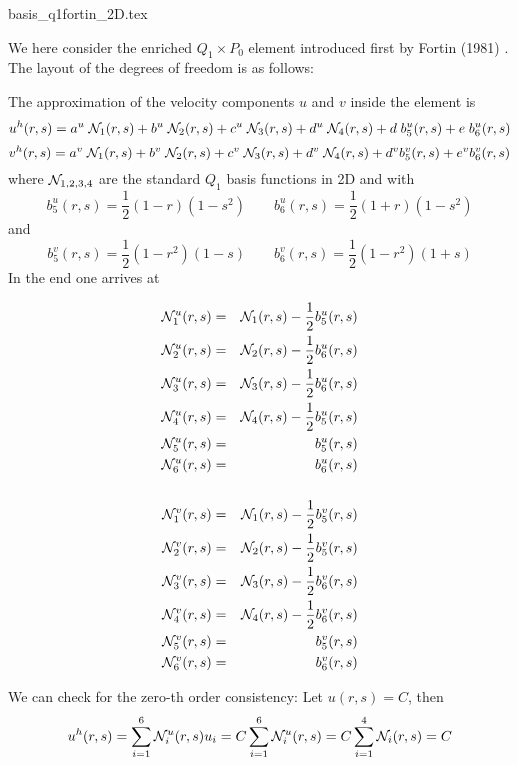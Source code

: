 \begin{flushright} {\tiny {\color{gray} basis\_q1fortin\_2D.tex}} \end{flushright}

We here consider the enriched $Q_1\times P_0$ element introduced first by 
Fortin (1981) \cite{fort81}.
The layout of the degrees of freedom is as follows:



\noindent The approximation of the velocity components $u$ and $v$ inside the element is
\[
u^h(r,s) = a^u \; {\mathcal{N}}_1(r,s) + b^u \;  {\mathcal{N}}_2(r,s) + c^u \; {\mathcal{N}}_3(r,s) +d^u \; {\mathcal{N}}_4(r,s) 
+ d\; b_5^u(r,s) + e\; b_{6}^u(r,s)
\]
\[
v^h(r,s) = a^v \; {\mathcal{N}}_1(r,s) + b^v \;  {\mathcal{N}}_2(r,s) + c^v \; {\mathcal{N}}_3(r,s) +d^v \; {\mathcal{N}}_4(r,s) 
+ d^v b_5^v(r,s) + e^v b_{6}^v(r,s)
\]
where ${\mathcal{N}}_{1,2,3,4}$ are the standard $Q_1$ basis functions in 2D and with 
\[
b_5^u(r,s) = \frac{1}{2}(1-r)(1-s^2)
\qquad
b_6^u(r,s) = \frac{1}{2}(1+r)(1-s^2)
\]
and
\[
b_5^v(r,s) = \frac{1}{2}(1-r^2)(1-s)
\qquad
b_6^v(r,s) = \frac{1}{2}(1-r^2)(1+s)
\]
In the end one arrives at

\begin{mdframed}[backgroundcolor=blue!5]
\begin{eqnarray}
{{\mathcal{N}}}_1^u(r,s) &=&  {\mathcal{N}}_1(r,s) - \frac{1}{2} b_5^u(r,s)\nonumber\\
{{\mathcal{N}}}_2^u(r,s) &=&  {\mathcal{N}}_2(r,s) - \frac{1}{2} b_6^u(r,s)\nonumber\\
{{\mathcal{N}}}_3^u(r,s) &=&  {\mathcal{N}}_3(r,s) - \frac{1}{2} b_6^u(r,s)\nonumber\\
{{\mathcal{N}}}_4^u(r,s) &=&  {\mathcal{N}}_4(r,s) - \frac{1}{2} b_5^u(r,s)\nonumber\\
{{\mathcal{N}}}_5^u(r,s) &=&  b_5^u(r,s) \nonumber\\
{{\mathcal{N}}}_6^u(r,s) &=&  b_6^u(r,s) \nonumber\\
\nonumber\\
{{\mathcal{N}}}_1^v(r,s) &=&  {\mathcal{N}}_1(r,s) - \frac{1}{2} b_5^v(r,s)\nonumber\\
{{\mathcal{N}}}_2^v(r,s) &=&  {\mathcal{N}}_2(r,s) - \frac{1}{2} b_5^v(r,s)\nonumber\\
{{\mathcal{N}}}_3^v(r,s) &=&  {\mathcal{N}}_3(r,s) - \frac{1}{2} b_6^v(r,s)\nonumber\\
{{\mathcal{N}}}_4^v(r,s) &=&  {\mathcal{N}}_4(r,s) - \frac{1}{2} b_6^v(r,s)\nonumber\\
{{\mathcal{N}}}_5^v(r,s) &=&  b_5^v(r,s) \nonumber\\
{{\mathcal{N}}}_6^v(r,s) &=&  b_6^v(r,s) 
\end{eqnarray}
\end{mdframed}

We can check for the zero-th order consistency: Let $u(r,s)=C$, then 
\begin{eqnarray}
u^h(r,s) 
= \sum_{i=1}^6 {\mathcal{N}}_i^u(r,s) u_i 
= C \sum_{i=1}^6 {\mathcal{N}}_i^u(r,s) 
= C \sum_{i=1}^4 {\mathcal{N}}_i(r,s)  
= C
\end{eqnarray}





